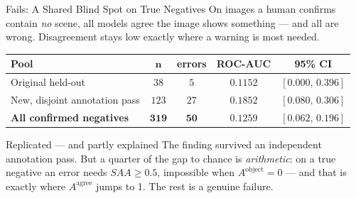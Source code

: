 \documentclass[aspectratio=169,11pt]{beamer}
\begin{document}
\begin{frame}{Fails: A Shared Blind Spot on True Negatives}
\small
On images a human confirms contain \emph{no} scene, all models agree the image shows something --- and all are wrong. Disagreement stays low exactly where a warning is most needed.
\vspace{1mm}
\begin{center}
\footnotesize
\begin{tabular}{@{}l c c c c@{}}
\toprule
\textbf{Pool} & $\bm n$ & \textbf{errors} & \textbf{ROC-AUC} & \textbf{95\% CI} \\
\midrule
Original held-out & $38$ & $5$ & $0.1152$ & $[0.000,\,0.396]$ \\
New, disjoint annotation pass & $123$ & $27$ & $0.1852$ & $[0.080,\,0.306]$ \\
\textbf{All confirmed negatives} & $\mathbf{319}$ & $\mathbf{50}$ & $\mathbf{0.1259}$ & $[0.062,\,0.196]$ \\
\bottomrule
\end{tabular}
\end{center}
\vspace{1mm}
\begin{alertblock}{\small Replicated --- and partly explained}
\footnotesize The finding survived an independent annotation pass. But a quarter of the gap to chance is \emph{arithmetic}: on a true negative an error needs $SAA\ge0.5$, impossible when $A^{\text{object}}=0$ --- and that is exactly where $A^{\text{agree}}$ jumps to 1. The rest is a genuine failure.
\end{alertblock}
\end{frame}
\end{document}
